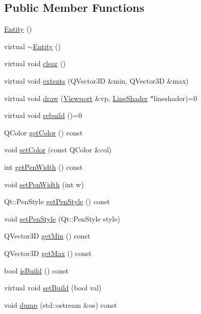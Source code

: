 \subsection*{Public Member Functions}
\begin{DoxyCompactItemize}
\item 
\hyperlink{classShipCAD_1_1Entity_a980f368aa07ce358583982821533a54a}{Entity} ()
\item 
virtual \hyperlink{classShipCAD_1_1Entity_a0fe3f9f7c8875a85afb214c8ebd75604}{$\sim$\-Entity} ()
\item 
virtual void \hyperlink{classShipCAD_1_1Entity_a998d0e5d360371046fd5835ba1e0877a}{clear} ()
\item 
virtual void \hyperlink{classShipCAD_1_1Entity_a08e8e53770c85002afa45f46e7bf10f8}{extents} (Q\-Vector3\-D \&min, Q\-Vector3\-D \&max)
\item 
virtual void \hyperlink{classShipCAD_1_1Entity_aa62e306d991140dcd564360f8f6e7539}{draw} (\hyperlink{classShipCAD_1_1Viewport}{Viewport} \&vp, \hyperlink{classShipCAD_1_1LineShader}{Line\-Shader} $\ast$lineshader)=0
\item 
virtual void \hyperlink{classShipCAD_1_1Entity_a2571654319df6ad6841a437be7a75395}{rebuild} ()=0
\item 
Q\-Color \hyperlink{classShipCAD_1_1Entity_ac2761283b2ea370bf308969131ed8e1f}{get\-Color} () const 
\item 
void \hyperlink{classShipCAD_1_1Entity_a5e0e5f174d287e807b5409b1aa5704bc}{set\-Color} (const Q\-Color \&col)
\item 
int \hyperlink{classShipCAD_1_1Entity_acf44d10747d8e1588030ef1e46155dfc}{get\-Pen\-Width} () const 
\item 
void \hyperlink{classShipCAD_1_1Entity_a1b8146f974735c90ea6a44a0cb5fba98}{set\-Pen\-Width} (int w)
\item 
Qt\-::\-Pen\-Style \hyperlink{classShipCAD_1_1Entity_a5912853854b82c79f47dd9117cc3d9bc}{get\-Pen\-Style} () const 
\item 
void \hyperlink{classShipCAD_1_1Entity_a50f556f934efd5517c984b09a2e17773}{set\-Pen\-Style} (Qt\-::\-Pen\-Style style)
\item 
Q\-Vector3\-D \hyperlink{classShipCAD_1_1Entity_a7c4227afa7a356a667224cfba69a24e5}{get\-Min} () const 
\item 
Q\-Vector3\-D \hyperlink{classShipCAD_1_1Entity_ad9e95df651ae01a48242604262b051b3}{get\-Max} () const 
\item 
bool \hyperlink{classShipCAD_1_1Entity_ab2f54a1745c95aa0871a8c57c114809e}{is\-Build} () const 
\item 
virtual void \hyperlink{classShipCAD_1_1Entity_a1889198398f42bb7f77a2334031c3f33}{set\-Build} (bool val)
\item 
void \hyperlink{classShipCAD_1_1Entity_a395d7573df06482d9deaecdc87d46944}{dump} (std\-::ostream \&os) const 
\end{DoxyCompactItemize}
